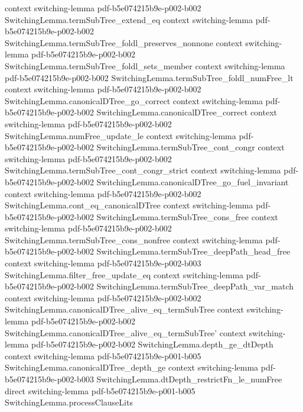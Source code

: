 \begin{lemma}
  {context}
  {switching-lemma}
  {pdf-b5e074215b9e-p002-b002}
\proofstep
  {SwitchingLemma.termSubTree_extend_eq}
  {context}
  {switching-lemma}
  {pdf-b5e074215b9e-p002-b002}
\proofstep
  {SwitchingLemma.termSubTree_foldl_preserves_nonnone}
  {context}
  {switching-lemma}
  {pdf-b5e074215b9e-p002-b002}
\proofstep
  {SwitchingLemma.termSubTree_foldl_sets_member}
  {context}
  {switching-lemma}
  {pdf-b5e074215b9e-p002-b002}
\proofstep
  {SwitchingLemma.termSubTree_foldl_numFree_lt}
  {context}
  {switching-lemma}
  {pdf-b5e074215b9e-p002-b002}
\proofstep
  {SwitchingLemma.canonicalDTree_go_correct}
  {context}
  {switching-lemma}
  {pdf-b5e074215b9e-p002-b002}
\proofstep
  {SwitchingLemma.canonicalDTree_correct}
  {context}
  {switching-lemma}
  {pdf-b5e074215b9e-p002-b002}
\proofstep
  {SwitchingLemma.numFree_update_le}
  {context}
  {switching-lemma}
  {pdf-b5e074215b9e-p002-b002}
\proofstep
  {SwitchingLemma.termSubTree_cont_congr}
  {context}
  {switching-lemma}
  {pdf-b5e074215b9e-p002-b002}
\proofstep
  {SwitchingLemma.termSubTree_cont_congr_strict}
  {context}
  {switching-lemma}
  {pdf-b5e074215b9e-p002-b002}
\proofstep
  {SwitchingLemma.canonicalDTree_go_fuel_invariant}
  {context}
  {switching-lemma}
  {pdf-b5e074215b9e-p002-b002}
\proofstep
  {SwitchingLemma.cont_eq_canonicalDTree}
  {context}
  {switching-lemma}
  {pdf-b5e074215b9e-p002-b002}
\proofstep
  {SwitchingLemma.termSubTree_cons_free}
  {context}
  {switching-lemma}
  {pdf-b5e074215b9e-p002-b002}
\proofstep
  {SwitchingLemma.termSubTree_cons_nonfree}
  {context}
  {switching-lemma}
  {pdf-b5e074215b9e-p002-b002}
\proofstep
  {SwitchingLemma.termSubTree_deepPath_head_free}
  {context}
  {switching-lemma}
  {pdf-b5e074215b9e-p002-b003}
\proofstep
  {SwitchingLemma.filter_free_update_eq}
  {context}
  {switching-lemma}
  {pdf-b5e074215b9e-p002-b002}
\proofstep
  {SwitchingLemma.termSubTree_deepPath_var_match}
  {context}
  {switching-lemma}
  {pdf-b5e074215b9e-p002-b002}
\proofstep
  {SwitchingLemma.canonicalDTree_alive_eq_termSubTree}
  {context}
  {switching-lemma}
  {pdf-b5e074215b9e-p002-b002}
\proofstep
  {SwitchingLemma.canonicalDTree_alive_eq_termSubTree'}
  {context}
  {switching-lemma}
  {pdf-b5e074215b9e-p002-b002}
\proofstep
  {SwitchingLemma.depth_ge_dtDepth}
  {context}
  {switching-lemma}
  {pdf-b5e074215b9e-p001-b005}
\proofstep
  {SwitchingLemma.canonicalDTree_depth_ge}
  {context}
  {switching-lemma}
  {pdf-b5e074215b9e-p002-b003}
\proofstep
  {SwitchingLemma.dtDepth_restrictFn_le_numFree}
  {direct}
  {switching-lemma}
  {pdf-b5e074215b9e-p001-b005}
\proofstep
  {SwitchingLemma.processClauseLits}

\end{lemma}
